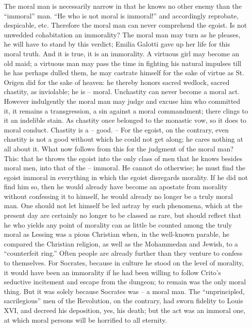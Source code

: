 The moral man is necessarily narrow in that he knows no other enemy than the 
``immoral'' man. ``He who is not moral is immoral!'' and accordingly 
reprobate, despicable, etc. Therefore the moral man can never comprehend the 
egoist. Is not unwedded cohabitation an immorality? The moral man may turn as 
he pleases, he will have to stand by this verdict; Emilia Galotti gave up her 
life for this moral truth. And it is true, it is an immorality. A virtuous 
girl may become an old maid; a virtuous man may pass the time in fighting his 
natural impulses till he has perhaps dulled them, he may castrate himself for 
the sake of virtue as St. Origen did for the sake of heaven: he thereby honors 
sacred wedlock, sacred chastity, as inviolable; he is -- moral. Unchastity can 
never become a moral act. However indulgently the moral man may judge and 
excuse him who committed it, it remains a transgression, a sin against a moral 
commandment; there clings to it an indelible stain. As chastity once belonged 
to the monastic vow, so it does to moral conduct. Chastity is a -- good. -- 
For the egoist, on the contrary, even chastity is not a good without which he 
could not get along; he cares nothing at all about it. What now follows from 
this for the judgment of the moral man? This: that he throws the egoist into 
the only class of men that he knows besides moral men, into that of the -- 
immoral. He cannot do otherwise; he must find the egoist immoral in everything 
in which the egoist disregards morality. If he did not find him so, then he 
would already have become an apostate from morality without confessing it to 
himself, he would already no longer be a truly moral man. One should not let 
himself be led astray by such phenomena, which at the present day are 
certainly no longer to be classed as rare, but should reflect that he who 
yields any point of morality can as little be counted among the truly moral as 
Lessing was a pious Christian when, in the well-known parable, he compared the 
Christian religion, as well as the Mohammedan and Jewish, to a ``counterfeit 
ring.'' Often people are already further than they venture to confess to 
themselves. For Socrates, because in culture he stood on the level of 
morality, it would have been an immorality if he had been willing to follow 
Crito's seductive incitement and escape from the dungeon; to remain was the 
only moral thing. But it was solely because Socrates was -- a moral man. The 
``unprincipled, sacrilegious'' men of the Revolution, on the contrary, had 
sworn fidelity to Louis XVI, and decreed his deposition, yes, his death; but 
the act was an immoral one, at which moral persons will be horrified to all 
eternity.

